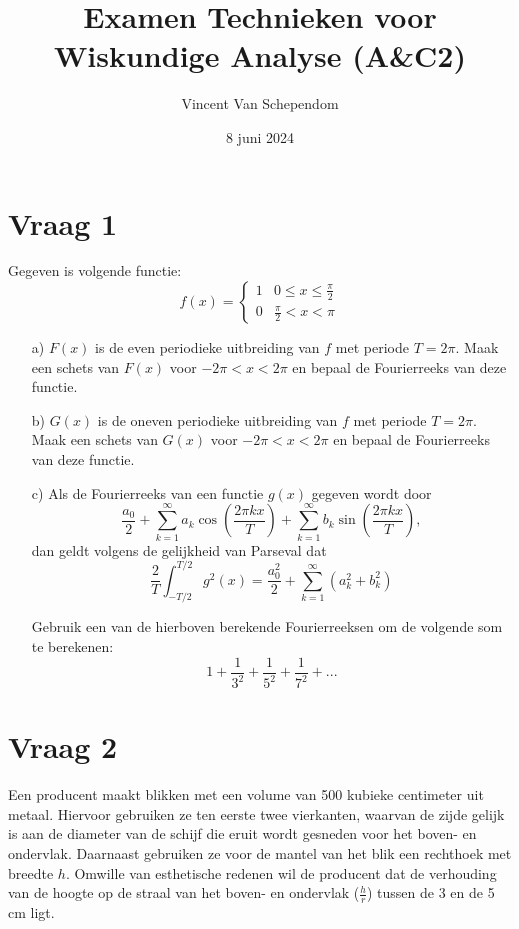 \documentclass[kulak]{kulakarticle} %
\title{Examen Technieken voor Wiskundige Analyse (A\&C2)}
\author{Vincent Van Schependom}
\date{8 juni 2024}
\begin{document}
\maketitle

\section*{Vraag 1}

Gegeven is volgende functie:
\[f(x)=\begin{cases}
	1 & 0 \leq x \leq \frac{\pi}{2} \\
	0 & \frac{\pi}{2} < x < \pi
\end{cases} \]

\begin{enumerate}
	\item[a)] \(F(x)\) is de even periodieke uitbreiding van \(f\) met periode \(T=2\pi\). Maak een schets van \(F(x)\) voor \(-2\pi < x <2\pi\) en bepaal de Fourierreeks van deze functie.
	\item[b)] \(G(x)\) is de oneven periodieke uitbreiding van \(f\) met periode \(T=2\pi\). Maak een schets van \(G(x)\) voor \(-2\pi < x <2\pi\) en bepaal de Fourierreeks van deze functie.
	\item[c)] Als de Fourierreeks van een functie \(g(x)\) gegeven wordt door
	\[ \frac{a_0}{2} + \sum_{k=1}^\infty{a_k\cos\left(\frac{2\pi kx}{T}\right)}
	+ \sum_{k=1}^\infty{b_k\sin\left(\frac{2\pi kx}{T}\right)}, \]
	dan geldt volgens de gelijkheid van Parseval dat
	\[ \frac{2}{T}\int_{-T/2}^{T/2}g^2(x)= \frac{a_0^2}{2} + \sum_{k=1}^\infty{(a_k^2+b_k^2)} \]

	Gebruik een van de hierboven berekende Fourierreeksen om de volgende som te berekenen:
	\[1+\frac{1}{3^2}+\frac{1}{5^2}+\frac{1}{7^2}+...\]
\end{enumerate}

\section*{Vraag 2}

Een producent maakt blikken met een volume van 500 kubieke centimeter uit metaal. Hiervoor gebruiken ze ten eerste twee vierkanten, waarvan de zijde gelijk is aan de diameter van de schijf die eruit wordt gesneden voor het boven- en ondervlak. Daarnaast gebruiken ze voor de mantel van het blik een rechthoek met breedte \(h\). Omwille van esthetische redenen wil de producent dat de verhouding van de hoogte op de straal van het boven- en ondervlak (\(\frac{h}{r}\)) tussen de 3 en de 5 cm ligt.
\end{document}
